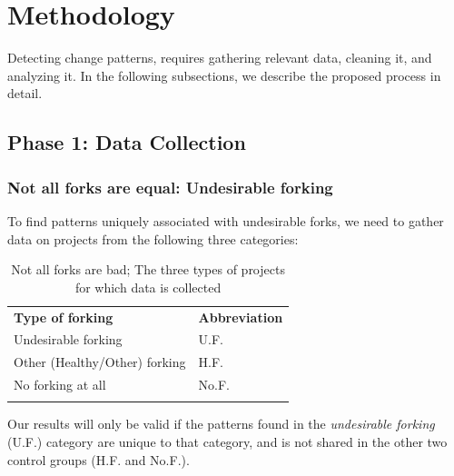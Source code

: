 \documentclass{report}
\begin{document}
\section{Methodology}
\label{methodology}

Detecting change patterns, requires gathering  relevant data, cleaning it, and analyzing it. In the following subsections, we describe the proposed process in detail. 

\subsection{Phase 1: Data Collection}

\subsubsection{Not all forks are equal: Undesirable forking}
To find patterns uniquely associated with undesirable forks, we need to gather data on projects from the following three categories: 

\begin{table}[!htbp]
\caption{Not all forks are bad; The three types of projects for which data is collected}
\label{tableUndesirableForkingDataCollect} 
\begin{tabular}{p{} p{}}
\hline\noalign{\smallskip}
\textbf{Type of forking} & \textbf{Abbreviation} \\
\noalign{\smallskip}\hline\noalign{\smallskip}
Undesirable forking & U.F. \\ \hline
Other (Healthy/Other) forking & H.F. \\\hline
No forking at all & No.F. \\
\noalign{\smallskip}\hline
\end{tabular}
\end{table}

Our results will only be valid if the patterns found in the \textit{undesirable forking} (U.F.) category are unique to that category, and is not shared in the other two control groups (H.F. and No.F.).
\end{document}
